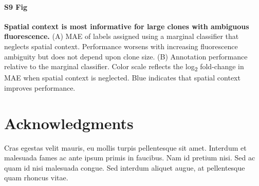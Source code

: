 \documentclass[10pt,letterpaper]{article}
\begin{document}
\paragraph*{S9 Fig} 
\label{S9_Fig}
{\bf Spatial context is most informative for large clones with ambiguous fluorescence.} (A) MAE of labels assigned using a marginal classifier that neglects spatial context. Performance worsens with increasing fluorescence ambiguity but does not depend upon clone size. (B) Annotation performance relative to the marginal classifier. Color scale reflects the log\textsubscript{2} fold-change in MAE when spatial context is neglected. Blue indicates that spatial context improves performance.



\section*{Acknowledgments}
Cras egestas velit mauris, eu mollis turpis pellentesque sit amet. Interdum et malesuada fames ac ante ipsum primis in faucibus. Nam id pretium nisi. Sed ac quam id nisi malesuada congue. Sed interdum aliquet augue, at pellentesque quam rhoncus vitae.

\nolinenumbers

%
%
% 
\end{document}
